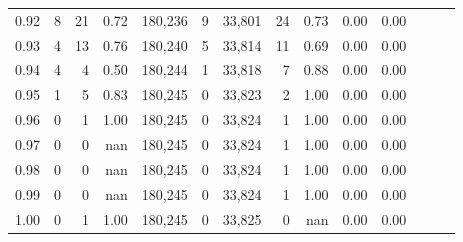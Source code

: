 \begin{tabular}{rrrrrrrrrrrrrr}
0.92 &      8 &   21 &  0.72 &  180,236 &        9 &  33,801 &      24 &  0.73 &  0.00 &      0.00 \\
0.93 &      4 &   13 &  0.76 &  180,240 &        5 &  33,814 &      11 &  0.69 &  0.00 &      0.00 \\
0.94 &      4 &    4 &  0.50 &  180,244 &        1 &  33,818 &       7 &  0.88 &  0.00 &      0.00 \\
0.95 &      1 &    5 &  0.83 &  180,245 &        0 &  33,823 &       2 &  1.00 &  0.00 &      0.00 \\
0.96 &      0 &    1 &  1.00 &  180,245 &        0 &  33,824 &       1 &  1.00 &  0.00 &      0.00 \\
0.97 &      0 &    0 &   nan &  180,245 &        0 &  33,824 &       1 &  1.00 &  0.00 &      0.00 \\
0.98 &      0 &    0 &   nan &  180,245 &        0 &  33,824 &       1 &  1.00 &  0.00 &      0.00 \\
0.99 &      0 &    0 &   nan &  180,245 &        0 &  33,824 &       1 &  1.00 &  0.00 &      0.00 \\
1.00 &      0 &    1 &  1.00 &  180,245 &        0 &  33,825 &       0 &   nan &  0.00 &      0.00 \\
\bottomrule
\end{tabular}
